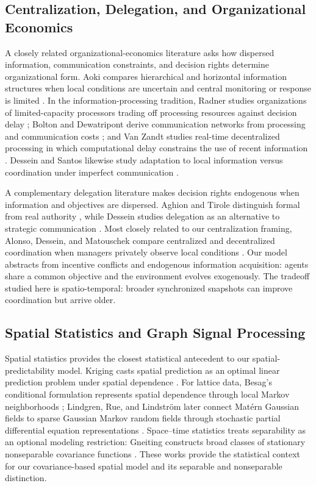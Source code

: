 \documentclass[11pt]{article}
\begin{document}
\subsection{Centralization, Delegation, and Organizational Economics}

A closely related organizational-economics literature asks how dispersed information, communication constraints, and decision rights determine organizational form. Aoki compares hierarchical and horizontal information structures when local conditions are uncertain and central monitoring or response is limited \cite{aoki1986horizontal}. In the information-processing tradition, Radner studies organizations of limited-capacity processors trading off processing resources against decision delay \cite{radner1993organization}; Bolton and Dewatripont derive communication networks from processing and communication costs \cite{bolton1994firm}; and Van Zandt studies real-time decentralized processing in which computational delay constrains the use of recent information \cite{vanzandt1999realtime}. Dessein and Santos likewise study adaptation to local information versus coordination under imperfect communication \cite{dessein2006adaptive}.

A complementary delegation literature makes decision rights endogenous when information and objectives are dispersed. Aghion and Tirole distinguish formal from real authority \cite{aghion1997formal}, while Dessein studies delegation as an alternative to strategic communication \cite{dessein2002authority}. Most closely related to our centralization framing, Alonso, Dessein, and Matouschek compare centralized and decentralized coordination when managers privately observe local conditions \cite{alonso2008coordination}. Our model abstracts from incentive conflicts and endogenous information acquisition: agents share a common objective and the environment evolves exogenously. The tradeoff studied here is spatio-temporal: broader synchronized snapshots can improve coordination but arrive older. 

\subsection{Spatial Statistics and Graph Signal Processing}
\label{subsec:related_spatial}

Spatial statistics provides the closest statistical antecedent to our spatial-predictability model. Kriging casts spatial prediction as an optimal linear prediction problem under spatial dependence \cite{cressie1990origins}. For lattice data, Besag's conditional formulation represents spatial dependence through local Markov neighborhoods \cite{besag1974spatial}; Lindgren, Rue, and Lindstr\"om later connect Mat\'ern Gaussian fields to sparse Gaussian Markov random fields through stochastic partial differential equation representations \cite{lindgren2011explicit}. Space--time statistics treats separability as an optional modeling restriction: Gneiting constructs broad classes of stationary nonseparable covariance functions \cite{gneiting2002nonseparable}. These works provide the statistical context for our covariance-based spatial model and its separable and nonseparable distinction.
\end{document}
